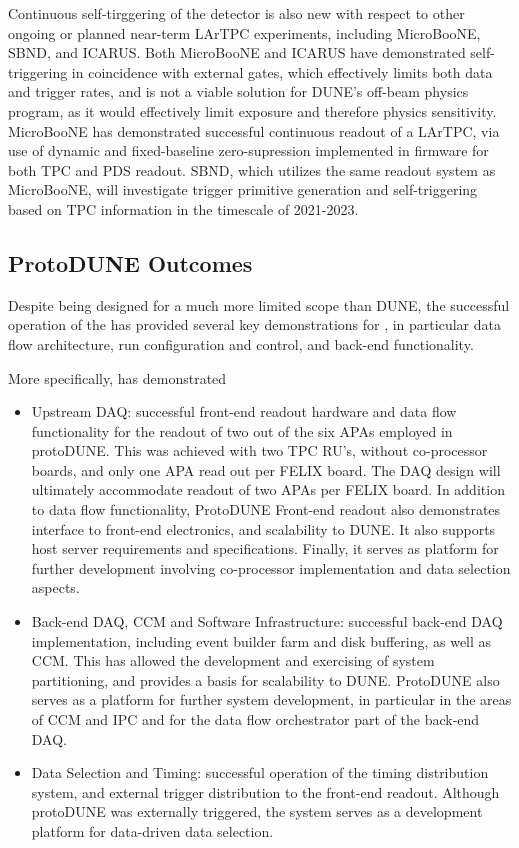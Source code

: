 Continuous self-tirggering of the detector is also new with respect to
other ongoing or planned near-term LArTPC experiments, including
MicroBooNE, SBND, and ICARUS. Both MicroBooNE and ICARUS have demonstrated
self-triggering in coincidence with external gates, which effectively
limits both data and trigger rates, and is not a viable solution for
DUNE's off-beam physics program, as it would effectively limit
exposure and therefore physics sensitivity. %
MicroBooNE has demonstrated successful continuous readout of a LArTPC,
via use of dynamic and fixed-baseline zero-supression implemented in
firmware for both TPC and PDS readout. SBND, which utilizes the same readout
system as MicroBooNE, will investigate trigger primitive generation
and self-triggering based on TPC information in the timescale of 2021-2023.


\subsection{ProtoDUNE Outcomes}

Despite being designed for a much more limited scope than DUNE, the %
successful operation of the   has provided several key
demonstrations for  , in particular data flow
architecture, run configuration and control, and back-end
functionality. %

More specifically,  has demonstrated 
\begin{itemize}
\item Upstream DAQ: successful
front-end readout hardware and data flow functionality for the readout
of two out of the six APAs employed in protoDUNE. This was achieved
with two TPC RU's, without co-processor boards, and only one APA read
out per FELIX board. The  DAQ design will ultimately
accommodate readout of two APAs per FELIX board. In addition to data
flow functionality, ProtoDUNE Front-end readout also demonstrates interface to
front-end electronics, and scalability to DUNE. It also supports
host server requirements and specifications. Finally, it serves as
platform for further development involving co-processor implementation
and data selection aspects.
\item Back-end DAQ, CCM and Software Infrastructure:
 successful back-end DAQ implementation, including event builder
  farm and disk buffering, as well as CCM. This has allowed the
  development and exercising of system partitioning, and provides a
  basis for scalability to DUNE. ProtoDUNE also serves as
  a platform for further system development, in particular in the
  areas of CCM and IPC and for the data flow orchestrator part of the
  back-end DAQ.
\item Data Selection and Timing: successful operation of the timing
  distribution system, and external trigger distribution to the
  front-end readout. Although protoDUNE was externally triggered, the
  system serves as a development platform for data-driven data selection.
\end{itemize}

